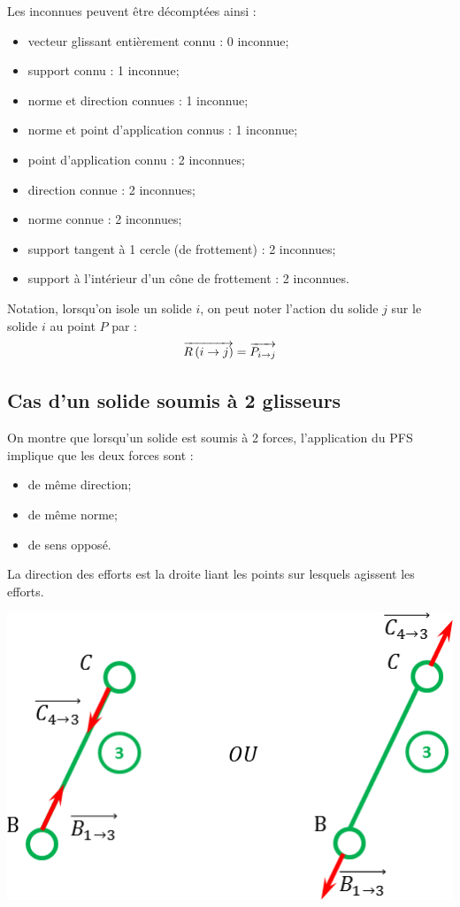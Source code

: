 \documentclass[10pt]{article}
\begin{document}
Les inconnues peuvent être décomptées ainsi :
\begin{itemize}
\item vecteur glissant entièrement connu : 0 inconnue;
\item support connu : 1 inconnue;
\item norme et direction connues : 1 inconnue;
\item norme et point d'application connus : 1 inconnue;
\item point d'application connu : 2 inconnues;
\item direction connue : 2 inconnues;
\item norme connue : 2 inconnues;
\item support tangent à 1 cercle (de frottement) : 2 inconnues;
\item support à l'intérieur d’un cône de frottement : 2 inconnues.
\end{itemize}

\begin{rem}
Notation, lorsqu'on isole un solide $i$, on peut noter l'action du solide $j$ sur le solide $i$ au point $P$ par : 
$$
\overrightarrow{R\left( {i} \rightarrow {j}\right)}=\overrightarrow{P_{i\rightarrow j}}
$$
\end{rem}
\subsection{Cas d'un solide soumis à 2 glisseurs}
\begin{minipage}[c]{.55\linewidth}
\begin{resultat}
On montre que lorsqu'un solide est soumis à 2 forces, l'application du PFS implique que les deux forces sont : 
\begin{itemize}
\item de même direction;
\item de même norme;
\item de sens opposé.
\end{itemize}

La direction des efforts est la droite liant les points sur lesquels agissent les efforts.
\end{resultat}
\end{minipage}\hfill
\begin{minipage}[c]{.4\linewidth}
\begin{center}
\includegraphics[width=.95\textwidth]{images/3F}
\end{center}
\end{minipage}
\end{document}
